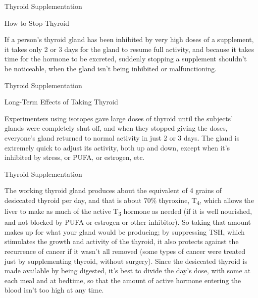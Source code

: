 \documentclass[11pt,oneside,openany,extrafontsizes]{memoir}
\begin{document}
\begin{standalonequote}{Thyroid Supplementation}
    \begin{note}
        How to Stop Thyroid
    \end{note}

    \begin{answer}
        If a person's thyroid gland has been inhibited by very high doses of a supplement, it takes only 2 or 3 days for the gland to resume full activity, and because it takes time for the hormone to be excreted, suddenly stopping a supplement shouldn't be noticeable, when the gland isn't being inhibited or malfunctioning.
    \end{answer}
\end{standalonequote}

\begin{standalonequote}{Thyroid Supplementation}
    \begin{note}
        Long-Term Effects of Taking Thyroid
    \end{note}

    \begin{answer}
        Experimenters using isotopes gave large doses of thyroid until the subjects' glands were completely shut off, and when they stopped giving the doses, everyone's gland returned to normal activity in just 2 or 3 days. The gland is extremely quick to adjust its activity, both up and down, except when it's inhibited by stress, or PUFA, or estrogen, etc.
    \end{answer}
\end{standalonequote}

\begin{standalonequote}{Thyroid Supplementation}

    \begin{answer}
        The working thyroid gland produces about the equivalent of 4 grains of desiccated thyroid per day, and that is about 70\% thyroxine, T\textsubscript{4}, which allows the liver to make as much of the active T\textsubscript{3} hormone as needed (if it is well nourished, and not blocked by PUFA or estrogen or other inhibitor). So taking that amount makes up for what your gland would be producing; by suppressing TSH, which stimulates the growth and activity of the thyroid, it also protects against the recurrence of cancer if it wasn't all removed (some types of cancer were treated just by supplementing thyroid, without surgery). Since the desiccated thyroid is made available by being digested, it's best to divide the day's dose, with some at each meal and at bedtime, so that the amount of active hormone entering the blood isn't too high at any time.
    \end{answer}
\end{standalonequote}
\end{document}
